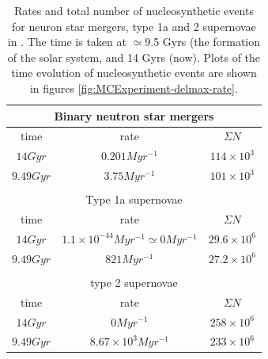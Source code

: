 \begin{table}
  \centering
  \begin{tabular}{|c|c|c|}
    \multicolumn{3}{c}{Binary neutron star mergers} \\ \hline
    time & rate & $\Sigma N$ \\ \hline 
    $14 Gyr$ & $0.201 Myr^{-1}$ & $114 \times 10^3$ \\ \hline 
    $9.49 Gyr$ & $3.75 Myr^{-1}$ & $101 \times 10^3$ \\ \hline
    \multicolumn{3}{c}{} \\
    \multicolumn{3}{c}{Type 1a supernovae} \\ \hline
    time & rate & $\Sigma N$ \\ \hline 
    $14 Gyr$ & $1.1 \times 10^{-44} Myr^{-1} \simeq 0 Myr^{-1}$ & $29.6 \times 10^{6}$ \\ \hline 
    $9.49 Gyr$ & $821 Myr^{-1}$ & $27.2 \times 10^{6}$ \\ \hline
    \multicolumn{3}{c}{} \\
    \multicolumn{3}{c}{type 2 supernovae} \\ \hline
    time & rate & $\Sigma N$ \\ \hline 
    $14 Gyr$ & $0 Myr^{-1}$ & $258 \times 10^{6}$ \\ \hline 
    $9.49 Gyr$ & $8.67 \times 10^{3} Myr^{-1}$ & $233 \times 10^{6}$ \\ \hline
  \end{tabular}
  \caption[]{\label{tab:nucleosynthetic-events}
    Rates and total number of nucleosynthetic events for neuron star mergers, type 1a and 2 supernovae in \omegamodel.
    The time is taken at $\simeq$9.5 Gyrs (the formation of the solar system, and 14 Gyrs (now).
    Plots of the time evolution of nucleosynthetic events are shown in figures \ref{fig:MCExperiment-delmax-rate}.
  }
\end{table}

